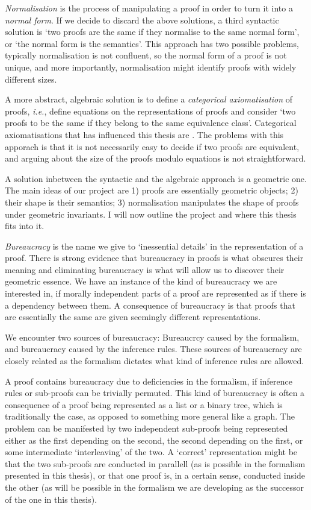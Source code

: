 \emph{Normalisation} is the process of manipulating a proof in order to turn it into a \emph{normal form}. If we decide to discard the above solutions, a third syntactic solution is `two proofs are the same if they normalise to the same normal form', or `the normal form is the semantics'. This approach has two possible problems, typically normalisation is not confluent, so the normal form of a proof is not unique, and more importantly, normalisation might identify proofs with widely different sizes.

A more abstract, algebraic solution is to define a \emph{categorical axiomatisation} of proofs, \emph{i.e.}, define equations on the representations of proofs and consider `two proofs to be the same if they belong to the same equivalence class'. Categorical axiomatisations that has influenced this thesis are \cite{LamaStra:05:Construc:qq,LamaStra:05:Naming-P:ov,}. The problems with this apporach is that it is not necessarily easy to decide if two proofs are equivalent, and arguing about the size of the proofs modulo equations is not straightforward.


A solution inbetween the syntactic and the algebraic approach is a geometric one. The main ideas of our project are 1) proofs are essentially geometric objects; 2) their shape is their semantics; 3) normalisation manipulates the shape of proofs under geometric invariants. I will now outline the project and where this thesis fits into it.

\emph{Bureaucracy} is the name we give to `inessential details' in the representation of a proof. There is strong evidence that bureaucracy in proofs is what obscures their meaning and eliminating bureaucracy is what will allow us to discover their geometric essence. We have an instance of the kind of bureaucracy we are interested in, if morally independent parts of a proof are represented as if there is a dependency between them. A consequence of bureaucracy is that proofs that are essentially the same are given seemingly different representations.

We encounter two sources of bureaucracy: Bureaucrcy caused by the formalism, and bureaucracy caused by the inference rules. These sources of bureaucracy are closely related as the formalism dictates what kind of inference rules are allowed.

A proof contains bureaucracy due to deficiencies in the formalism, if inference rules or sub-proofs can be trivially permuted. This kind of bureaucracy is often a consequence of a proof being represented as a list or a binary tree, which is traditionally the case, as opposed to something more general like a graph. The problem can be manifested by two independent sub-proofs being represented either as the first depending on the second, the second depending on the first, or some intermediate `interleaving' of the two. A `correct' representation might be that the two sub-proofs are conducted in parallell (as is possible in the formalism presented in this thesis), or that one proof is, in a certain sense, conducted inside the other (as will be possible in the formalism we are developing as the successor of the one in this thesis).

